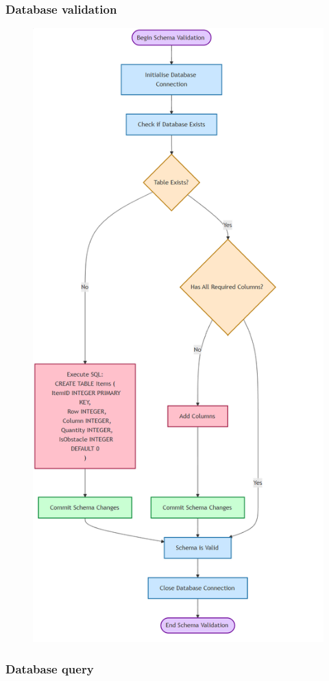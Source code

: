 \newpage

\subsubsection{Database validation}

\begin{figure}[htbp]
    \centering
    \includegraphics[width=0.52\linewidth]{Flowcharts/dbinit.png}
\end{figure}

\newpage

\subsubsection{Database query}

